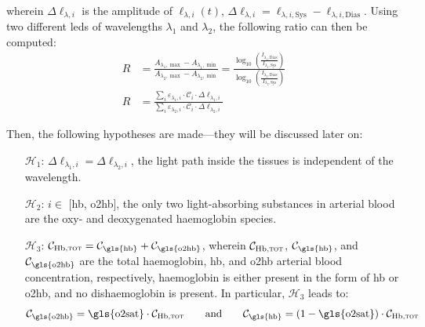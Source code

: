 wherein $\Delta\ell_{\lambda, i}$ is the amplitude of $\ell_{\lambda, i}(t)$, \ie{} $\Delta\ell_{\lambda, i} = \ell_{\lambda, i, \text{Sys}} - \ell_{\lambda, i, \text{Dias}}$. Using two different \glspl{led} of wavelengths $\lambda_1$ and $\lambda_2$, the following ratio can then be computed:
\begin{equation}\label{eq:co2hb:ratio_def}
	\begin{aligned}
		R &= \frac{A_{\lambda_1,\max} - A_{\lambda_1,\min}}{A_{\lambda_2,\max} - A_{\lambda_2,\min}} = \frac{\log_{10}\left(\frac{I_{\lambda_1,\text{Dias}}}{I_{\lambda_1,\text{Sys}}}\right)}{\log_{10}\left(\frac{I_{\lambda_2,\text{Dias}}}{I_{\lambda_2,\text{Sys}}}\right)}\\
		R &= \frac{\sum_{i} \varepsilon_{\lambda_1, i} \cdot \mathcal{C}_i \cdot \Delta\ell_{\lambda_1, i}}{\sum_{i} \varepsilon_{\lambda_2, i} \cdot \mathcal{C}_i \cdot \Delta\ell_{\lambda_2, i}}
	\end{aligned}
\end{equation}

Then, the following hypotheses are made---they will be discussed later on:
\begin{itemize}
	\item[$\mathcal{H}_1$:] $\Delta\ell_{\lambda_1, i} = \Delta\ell_{\lambda_2, i}$, \ie{} the light path inside the tissues is independent of the wavelength.
	\item[$\mathcal{H}_2$:] $i\in$ [\gls{hb}, \gls{o2hb}], \ie{} the only two light-absorbing substances in arterial blood are the oxy- and deoxygenated haemoglobin species.
	\item[$\mathcal{H}_3$:] $\mathcal{C}_\text{Hb,\sc{tot}} = \mathcal{C}_\text{\gls{hb}} + \mathcal{C}_\text{\gls{o2hb}}$, wherein $\mathcal{C}_\text{Hb,\sc{tot}}$, $\mathcal{C}_\text{\gls{hb}}$, and $\mathcal{C}_\text{\gls{o2hb}}$ are the total haemoglobin, \gls{hb}, and \gls{o2hb} arterial blood concentration, respectively, \ie{} haemoglobin is either present in the form of \gls{hb} or \gls{o2hb}, and no dishaemoglobin is present. In particular, $\mathcal{H}_3$ leads to:
	\begin{equation}
		\mathcal{C}_\text{\gls{o2hb}} = \text{\gls{o2sat}} \cdot \mathcal{C}_\text{Hb,\sc{tot}} \qquad\text{and}\qquad \mathcal{C}_\text{\gls{hb}} = (1-\text{\gls{o2sat}}) \cdot \mathcal{C}_\text{Hb,\sc{tot}}
	\end{equation}
\end{itemize}

